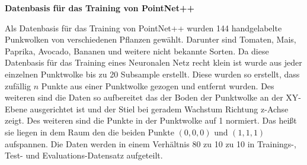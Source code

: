 \documentclass[12pt,titlepage, twoside]{article}
\begin{document}

\textbf{Datenbasis für das Training von PointNet++}

Als Datenbasis für das Training von PointNet++ wurden 144 handgelabelte Punkwolken von verschiedenen Pflanzen gewählt. Darunter sind Tomaten, Mais, Paprika, Avocado, Bananen und weitere nicht bekannte Sorten. 
Da diese Datenbasis für das Training eines Neuronalen Netz recht klein ist wurde aus jeder einzelnen Punktwolke bis zu 20 Subsample erstellt. Diese wurden so erstellt, dass zufällig $n$ Punkte aus einer Punktwolke gezogen und entfernt wurden.
Des weiteren sind die Daten so aufbereitet das der Boden der Punktwolke an der XY-Ebene ausgerichtet ist und der Stiel bei geradem Wachstum Richtung z-Achse zeigt. Des weiteren sind die Punkte in der Punktwolke auf 1 normiert. 
Das heißt sie liegen in dem Raum den die beiden Punkte $(0,0,0)$ und $(1,1,1)$ aufspannen. Die Daten werden in einem Verhältnis 80 zu 10 zu 10 in Trainings-, Test- und Evaluations-Datensatz aufgeteilt.
\end{document}
